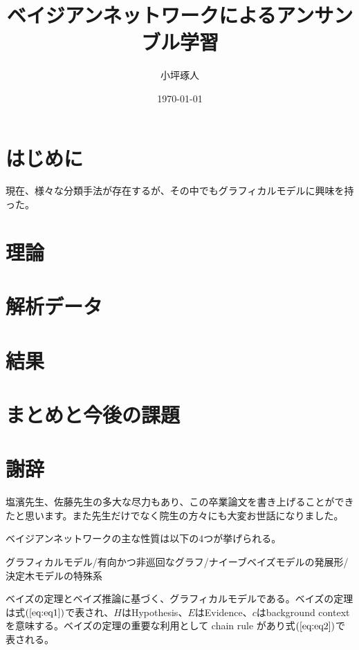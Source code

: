 \documentclass[a4j,12pt]{jarticle}
\title{ベイジアンネットワークによるアンサンブル学習}   %
\author{小坪琢人}   %
\date{\today}   %
\begin{document}
\maketitle   %
\setlength{\baselineskip}{20pt}   %
\tableofcontents   %
\listoffigures   %
\listoftables   %
\clearpage   %


\section{はじめに}

現在、様々な分類手法が存在するが、その中でもグラフィカルモデルに興味を持った。

\section{理論}

\section{解析データ}

\section{結果}

\section{まとめと今後の課題}

\section{謝辞}

塩濱先生、佐藤先生の多大な尽力もあり、この卒業論文を書き上げることができたと思います。また先生だけでなく院生の方々にも大変お世話になりました。


ベイジアンネットワークの主な性質は以下の4つが挙げられる。

グラフィカルモデル/有向かつ非巡回なグラフ/ナイーブベイズモデルの発展形/決定木モデルの特殊系

ベイズの定理とベイズ推論に基づく、グラフィカルモデルである。ベイズの定理は式$(\ref{eq:eq1})$で表され、$H$はHypothesis、$E$はEvidence、$c$はbackground contextを意味する。ベイズの定理の重要な利用として chain rule があり式$(\ref{eq:eq2})$で表される。
\end{document}
